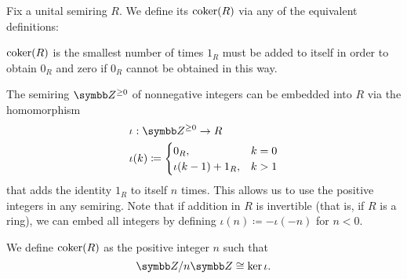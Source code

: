 \begin{definition}\label{def:semiring_characteristic}
  Fix a unital semiring \( R \). We define its  \( \operatorname{coker}(R) \) via any of the equivalent definitions:
  \begin{defenum}
     \( \operatorname{coker}(R) \) is the smallest number of times \( 1_R \) must be added to itself in order to obtain \( 0_R \) and zero if \( 0_R \) cannot be obtained in this way.

     The semiring \( \Z^{\geq 0} \) of nonnegative integers can be embedded into \( R \) via the homomorphism
    \begin{align*}
      &\iota: \Z^{\geq 0} \to R \\
      &\iota(k) \coloneqq \begin{cases}
        0_R, &k = 0 \\
        \iota(k - 1) + 1_R, &k > 1
      \end{cases}
    \end{align*}
    that adds the identity \( 1_R \) to itself \( n \) times. This allows us to use the positive integers in any semiring. Note that if addition in \( R \) is invertible (that is, if \( R \) is a ring), we can embed all integers by defining \( \iota(n) \coloneqq -\iota(-n) \) for \( n < 0 \).

    We define \( \operatorname{coker}(R) \) as the positive integer \( n \) such that
    \begin{equation*}
      \Z / n\Z \cong \ker\iota.
    \end{equation*}
  \end{defenum}
\end{definition}

